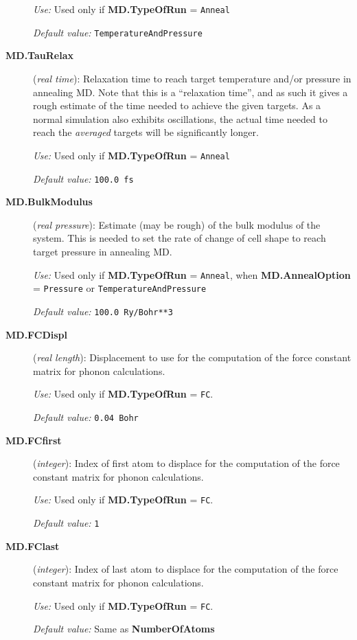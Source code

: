 \documentclass[11pt]{article}
\begin{document}
\begin{description}
{\it Use:} Used only if {\bf MD.TypeOfRun} = {\tt Anneal}

{\it Default value:} {\tt TemperatureAndPressure}

\item[{\bf MD.TauRelax}] ({\it real time}): 
Relaxation time to reach target temperature
and/or pressure in annealing MD. Note that this is a ``relaxation
time'', and as such it gives a rough estimate of the time needed to
achieve the given targets. As a normal simulation also exhibits
oscillations, the actual time needed to reach the {\it averaged}
targets will be significantly longer.

{\it Use:} Used only if {\bf MD.TypeOfRun} = {\tt Anneal}

{\it Default value:} {\tt 100.0 fs}

\item[{\bf MD.BulkModulus}] ({\it real pressure}): 
Estimate (may be rough) of the bulk modulus of the system.
This is needed to set the rate of change of cell shape
to reach target pressure in annealing MD.

{\it Use:} Used only if {\bf MD.TypeOfRun} = {\tt Anneal}, when
{\bf MD.AnnealOption} = {\tt Pressure} or {\tt TemperatureAndPressure}

{\it Default value:}  {\tt 100.0 Ry/Bohr**3}
        
\item[{\bf MD.FCDispl}] ({\it real length}): 
Displacement to use for the computation of the force constant
matrix for phonon calculations.

{\it Use:} Used only if {\bf MD.TypeOfRun} = {\tt FC}.

{\it Default value:}  {\tt 0.04 Bohr}

\item[{\bf MD.FCfirst}] ({\it integer}): 
Index of first atom to displace for the computation of the force constant
matrix for phonon calculations.

{\it Use:} Used only if {\bf MD.TypeOfRun} = {\tt FC}.

{\it Default value:}  {\tt 1}

\item[{\bf MD.FClast}] ({\it integer}): 
Index of last atom to displace for the computation of the force constant
matrix for phonon calculations.

{\it Use:} Used only if {\bf MD.TypeOfRun} = {\tt FC}.

{\it Default value:}  Same as {\bf NumberOfAtoms}


\end{description}
\end{document}
